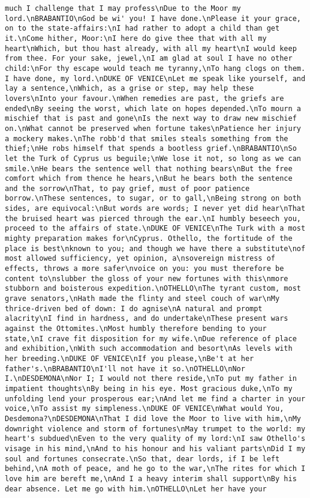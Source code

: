 \begin{verbatim}
much I challenge that I may profess\nDue to the Moor my lord.\nBRABANTIO\nGod be wi' you! I have done.\nPlease it your grace, on to the state-affairs:\nI had rather to adopt a child than get it.\nCome hither, Moor:\nI here do give thee that with all my heart\nWhich, but thou hast already, with all my heart\nI would keep from thee. For your sake, jewel,\nI am glad at soul I have no other child:\nFor thy escape would teach me tyranny,\nTo hang clogs on them. I have done, my lord.\nDUKE OF VENICE\nLet me speak like yourself, and lay a sentence,\nWhich, as a grise or step, may help these lovers\nInto your favour.\nWhen remedies are past, the griefs are ended\nBy seeing the worst, which late on hopes depended.\nTo mourn a mischief that is past and gone\nIs the next way to draw new mischief on.\nWhat cannot be preserved when fortune takes\nPatience her injury a mockery makes.\nThe robb'd that smiles steals something from the thief;\nHe robs himself that spends a bootless grief.\nBRABANTIO\nSo let the Turk of Cyprus us beguile;\nWe lose it not, so long as we can smile.\nHe bears the sentence well that nothing bears\nBut the free comfort which from thence he hears,\nBut he bears both the sentence and the sorrow\nThat, to pay grief, must of poor patience borrow.\nThese sentences, to sugar, or to gall,\nBeing strong on both sides, are equivocal:\nBut words are words; I never yet did hear\nThat the bruised heart was pierced through the ear.\nI humbly beseech you, proceed to the affairs of state.\nDUKE OF VENICE\nThe Turk with a most mighty preparation makes for\nCyprus. Othello, the fortitude of the place is best\nknown to you; and though we have there a substitute\nof most allowed sufficiency, yet opinion, a\nsovereign mistress of effects, throws a more safer\nvoice on you: you must therefore be content to\nslubber the gloss of your new fortunes with this\nmore stubborn and boisterous expedition.\nOTHELLO\nThe tyrant custom, most grave senators,\nHath made the flinty and steel couch of war\nMy thrice-driven bed of down: I do agnise\nA natural and prompt alacrity\nI find in hardness, and do undertake\nThese present wars against the Ottomites.\nMost humbly therefore bending to your state,\nI crave fit disposition for my wife.\nDue reference of place and exhibition,\nWith such accommodation and besort\nAs levels with her breeding.\nDUKE OF VENICE\nIf you please,\nBe't at her father's.\nBRABANTIO\nI'll not have it so.\nOTHELLO\nNor I.\nDESDEMONA\nNor I; I would not there reside,\nTo put my father in impatient thoughts\nBy being in his eye. Most gracious duke,\nTo my unfolding lend your prosperous ear;\nAnd let me find a charter in your voice,\nTo assist my simpleness.\nDUKE OF VENICE\nWhat would You, Desdemona?\nDESDEMONA\nThat I did love the Moor to live with him,\nMy downright violence and storm of fortunes\nMay trumpet to the world: my heart's subdued\nEven to the very quality of my lord:\nI saw Othello's visage in his mind,\nAnd to his honour and his valiant parts\nDid I my soul and fortunes consecrate.\nSo that, dear lords, if I be left behind,\nA moth of peace, and he go to the war,\nThe rites for which I love him are bereft me,\nAnd I a heavy interim shall support\nBy his dear absence. Let me go with him.\nOTHELLO\nLet her have your 
\end{verbatim}
